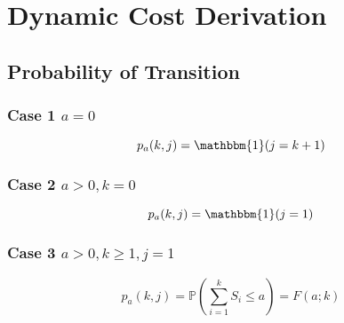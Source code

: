 \chapter{Dynamic Cost Derivation}

\section{Probability of Transition}
\subsection{Case 1 $a = 0$}
\begin{equation*}
	p_{a} (k, j) = \mathbbm{1} (j = k + 1)
\end{equation*}

\subsection{Case 2 $a > 0, k = 0$}
\begin{equation*}
	p_{a} (k, j) = \mathbbm{1} (j = 1)
\end{equation*}

\subsection{Case 3 $a > 0, k \geq 1, j = 1$}
\begin{equation*}
	p_{a} (k, j) = \mathbb{P} \left( \sum_{i = 1}^{k} S_{i} \leq a \right) = F (a; k)
\end{equation*}

